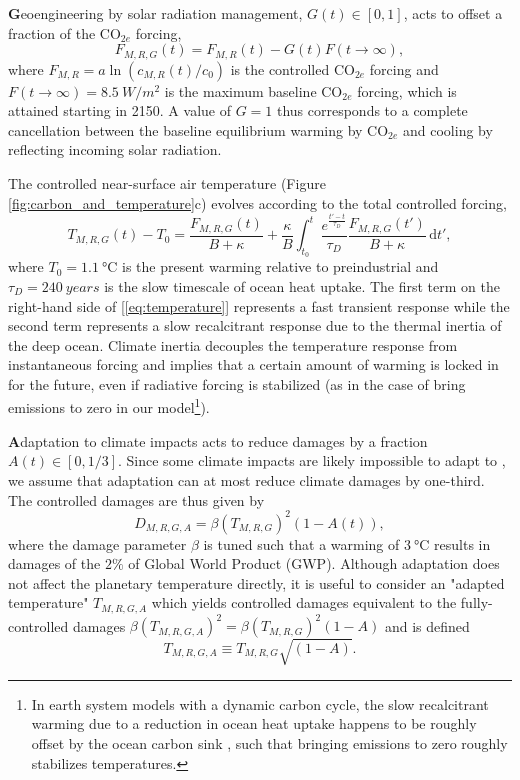 \documentclass[9pt,twocolumn,twoside,lineno]{pnas-new}
\begin{document}
\textbf{G}eoengineering by solar radiation management, $G(t) \in [0,1]$, acts to offset a fraction of the CO$_{2e}$ forcing, 
\begin{equation}
    F_{M,R,G}(t) = F_{M,R}(t) - G(t) F(t \rightarrow \infty),
\end{equation}
where $F_{M,R} = a \ln(c_{M,R}(t) / c_{0})$ is the controlled CO$_{2e}$ forcing and $F(t \rightarrow \infty) = \SI{8.5}{W/m^{2}}$ is the maximum baseline CO$_{2e}$ forcing, which is attained starting in 2150. A value of $G = 1$ thus corresponds to a complete cancellation between the baseline equilibrium warming by CO$_{2e}$ and cooling by reflecting incoming solar radiation.

The controlled near-surface air temperature (Figure \ref{fig:carbon_and_temperature}c) evolves according to the total controlled forcing,
\begin{equation}
    T_{M,R,G}(t) - T_{0} = \frac{F_{M,R,G}(t)}{B + \kappa} + \frac{\kappa}{B} \int_{t_{0}}^{t} \frac{e^{\frac{t'-t}{\tau_{D}}}}{\tau_{D}} \frac{F_{M,R,G}(t')}{B+\kappa} \, \text{d}t',
    \label{eq:temperature}
\end{equation}
where $T_{0} = \SI{1.1}{\celsius}$ is the present warming relative to preindustrial and $\tau_{D} = \SI{240}{years}$ is the slow timescale of ocean heat uptake. The first term on the right-hand side of [\ref{eq:temperature}] represents a fast transient response while the second term represents a slow recalcitrant response due to the thermal inertia of the deep ocean. Climate inertia decouples the temperature response from instantaneous forcing and implies that a certain amount of warming is locked in for the future, even if radiative forcing is stabilized (as in the case of bring emissions to zero in our model\footnote{In earth system models with a dynamic carbon cycle, the slow recalcitrant warming due to a reduction in ocean heat uptake happens to be roughly offset by the ocean carbon sink \cite{solomon_irreversible_2009,lickley_time_2019}, such that bringing emissions to zero roughly stabilizes temperatures.}).

\textbf{A}daptation to climate impacts acts to reduce damages by a fraction $A(t) \in [0, 1/3]$. Since some climate impacts are likely impossible to adapt to \cite[][]{sherwood_adaptability_2010}, we assume that adaptation can at most reduce climate damages by one-third. The controlled damages are thus given by
\begin{equation}
    D_{M,R,G,A} = \beta (T_{M,R,G})^{2} (1-A(t)),
    \label{eq:damages}
\end{equation}
where the damage parameter $\beta$ is tuned such that a warming of $\SI{3}{\celsius}$ results in damages of the $2\%$ of Global World Product (GWP). Although adaptation does not affect the planetary temperature directly, it is useful to consider an "adapted temperature" $T_{M,R,G,A}$ which yields controlled damages equivalent to the fully-controlled damages $\beta (T_{M,R,G,A})^{2} = \beta (T_{M,R,G})^{2} (1-A)$ and is defined
\begin{equation}
    T_{M,R,G,A} \equiv T_{M,R,G} \sqrt{(1-A)}.\label{eq:adapted-temperature}
\end{equation}
\end{document}
